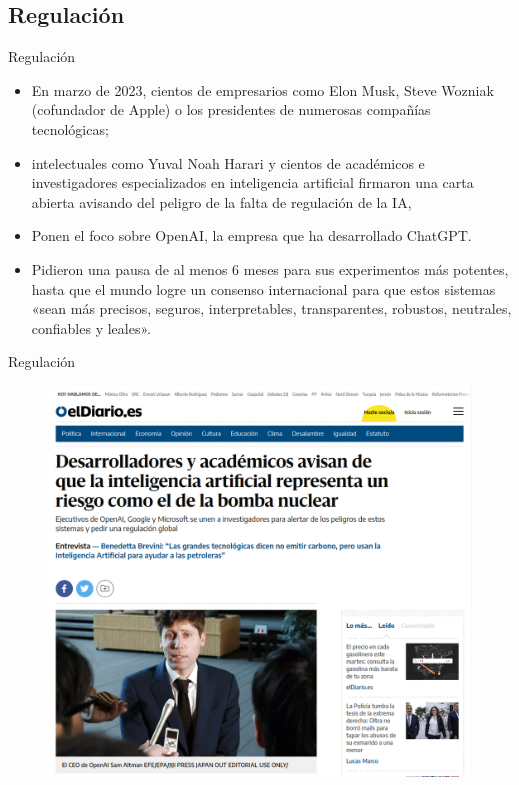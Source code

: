 \documentclass[11pt,aspectratio=169]{beamer}
\begin{document}
\subsection{Regulación}
\begin{frame}{Regulación}
    \begin{itemize}
        \item En marzo de 2023, cientos de empresarios como Elon Musk, Steve Wozniak 
            (cofundador de Apple) o los presidentes de numerosas compañías tecnológicas; 
        \item intelectuales como Yuval Noah Harari y cientos de académicos e investigadores 
            especializados en inteligencia artificial firmaron una carta abierta avisando 
            del peligro de la falta de regulación de la IA, 
        \item Ponen el foco sobre OpenAI, la empresa que ha desarrollado ChatGPT. 
        \item Pidieron una pausa de al menos 6 meses para sus experimentos más potentes, 
            hasta que el mundo logre un consenso internacional para que estos sistemas 
            «sean más precisos, seguros, interpretables, transparentes, robustos, neutrales, 
            confiables y leales».
    \end{itemize}
\end{frame}

\begin{frame}{Regulación}
    \begin{figure}
        \centering
        \href{https://www.eldiario.es/tecnologia/creadores-inteligencias-artificiales-academicos-piden-equiparar-riesgos-bomba-nuclear_1_10253632.html}{\includegraphics[scale=0.35]{img/RiesgoIAmayo2023.png}}
    \end{figure}
\end{frame}
\end{document}
